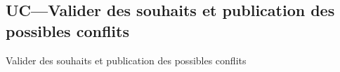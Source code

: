 \begin{ocl}
\begin{comment}

 \subsubsection{Conflit entre deux enseignants - résolution par le chef de département}
 \begin{figure}[!htbp]
 \begin{center}
 \texttt{[image: fig/scenario1.jpg]}
 \caption{Scénario : conflit entre deux enseignants - résolution par le chef de département}
 \end{center}
 \end{figure}

Dans ce scénario, le conflit est réglé par le chef de département qui affecte l'enseignement à un seul des deux enseignants (la demande de l'autre enseignant est alors considérée comme étant refusée).

 \subsubsection{Conflit entre deux enseignants - résolution par un des enseignants}
 \begin{figure}[!htbp]
 \begin{center}
 \texttt{[image: fig/scenario2.jpg]}
 \caption{Scénario : conflit entre deux enseignants - résolution par un des enseignants}
 \end{center}
 \end{figure}

 Dans ce scénario, le conflit est réglé par un des deux enseignants qui annule son vœu concernant l'enseignement à l'origine du conflit.  

\end{comment}

\subsection{UC---Valider des souhaits et publication des possibles conflits}

\begin{usecase}{Valider des souhaits et publication des possibles conflits}
\label{usecase:publier}
\begin{information}
	

\end{information}
\end{usecase}
\end{ocl}
